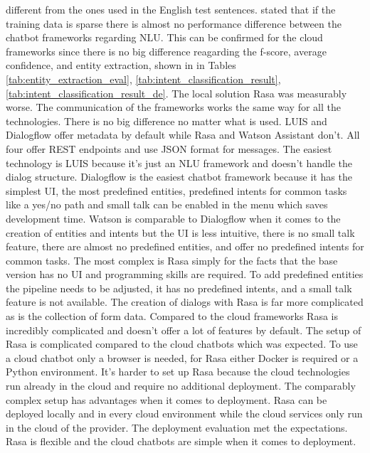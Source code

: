 different from the ones used in the English test sentences.
\citet{braunEvaluatingNLU} stated that if the training data is sparse there is almost no 
performance difference between the chatbot frameworks regarding NLU.
This can be confirmed for the cloud frameworks since there is no big difference reagarding the f-score, 
average confidence, and entity extraction, shown in in Tables \ref{tab:entity_extraction_eval}, \ref{tab:intent_classification_result}, \ref{tab:intent_classification_result_de}.
The local solution Rasa was measurably worse.
The communication of the frameworks works the same way for all the technologies.
There is no big difference no matter what is used.
LUIS and Dialogflow offer metadata by default while Rasa and Watson Assistant don't.
All four offer REST endpoints and use JSON format for messages.
The easiest technology is LUIS because it's just an NLU framework and doesn't handle the dialog structure.
Dialogflow is the easiest chatbot framework because it has the simplest UI, the most predefined entities,
predefined intents for common tasks like a yes/no path and small talk can be enabled in the menu which 
saves development time.
Watson is comparable to Dialogflow when it comes to the creation of entities and intents but the 
UI is less intuitive, there is no small talk feature, there are almost no predefined entities, 
and offer no predefined intents for common tasks.
The most complex is Rasa simply for the facts that the base version has no UI and programming 
skills are required.
To add predefined entities the pipeline needs to be adjusted, it has no predefined intents, 
and a small talk feature is not available.
The creation of dialogs with Rasa is far more complicated as is the collection of form data.
Compared to the cloud frameworks Rasa is incredibly complicated and doesn't offer a lot of 
features by default.
The setup of Rasa is complicated compared to the cloud chatbots which was expected.
To use a cloud chatbot only a browser is needed, for Rasa either Docker is required or a Python
environment.
It's harder to set up Rasa because the cloud technologies run already in the cloud and require 
no additional deployment.
The comparably complex setup has advantages when it comes to deployment.
Rasa can be deployed locally and in every cloud environment while the cloud services only 
run in the cloud of the provider.
The deployment evaluation met the expectations.
Rasa is flexible and the cloud chatbots are simple when it comes to deployment.
